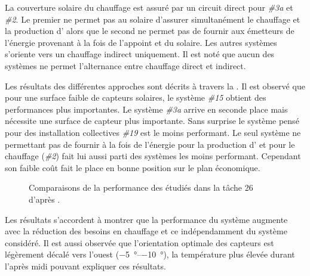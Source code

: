 La couverture solaire du chauffage est assuré par un circuit direct pour
\emph{\#3a} et \emph{\#2}. Le premier ne permet pas au solaire d’assurer simultanément
le chauffage et la production d’ alors que le second ne permet pas de fournir
aux émetteurs de l’énergie provenant à la fois de l’appoint et du solaire.
Les autres systèmes s’oriente vers un chauffage indirect uniquement. Il est noté que
aucun des systèmes ne permet l’alternance entre chauffage direct et indirect.

Les résultats des différentes approches sont décrits à travers la .
Il est observé que pour une surface faible de capteurs solaires, le système \emph{\#15}
obtient des performances plus importantes. Le système \emph{\#3a} arrive en seconde place
mais nécessite une surface de capteur plus importante. Sans surprise le système pensé
pour des installation collectives \emph{\#19} est le moins performant. Le seul système
ne permettant pas de fournir à la fois de l’énergie pour la production d’
et pour le chauffage (\emph{\#2}) fait lui aussi parti des systèmes les moins performant.
Cependant son faible coût fait le place en bonne position sur le plan économique.

\begin{table}
\centering
{}
\caption{Différences principales entre les différents modèles modélisés dans la tâche 26.}
\label{tab:diff_ssc}

\end{table}


\begin{figure}
    \centering
    \caption{Comparaisons de la performance des  étudiés dans la tâche
             26 d’après \textcite{Task26C2007}.}
    \label{fig:compare_perf_ssc}
\end{figure}


Les résultats s’accordent à montrer que la performance du système augmente avec la réduction des
besoins en chauffage et ce indépendamment du système considéré.
Il est aussi observée que l’orientation optimale des capteurs est légèrement décalé vers
l’ouest (\SIrange{-5}{-10}{\degree}), la température plus élevée durant l’après midi pouvant
expliquer ces résultats.

